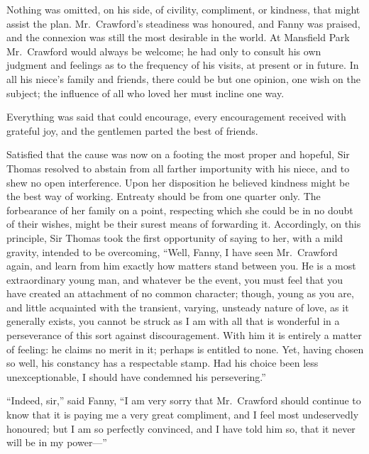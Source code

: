 Nothing was omitted, on his side, of civility, compliment,
or kindness, that might assist the plan.  Mr.\ Crawford's
steadiness was honoured, and Fanny was praised, and the
connexion was still the most desirable in the world.
At Mansfield Park Mr.\ Crawford would always be welcome;
he had only to consult his own judgment and feelings as
to the frequency of his visits, at present or in future.
In all his niece's family and friends, there could be
but one opinion, one wish on the subject; the influence
of all who loved her must incline one way.

Everything was said that could encourage, every encouragement
received with grateful joy, and the gentlemen parted
the best of friends.

Satisfied that the cause was now on a footing the most
proper and hopeful, Sir Thomas resolved to abstain
from all farther importunity with his niece, and to
shew no open interference.  Upon her disposition he
believed kindness might be the best way of working.
Entreaty should be from one quarter only.  The forbearance
of her family on a point, respecting which she could
be in no doubt of their wishes, might be their surest
means of forwarding it.  Accordingly, on this principle,
Sir Thomas took the first opportunity of saying to her,
with a mild gravity, intended to be overcoming,
``Well, Fanny, I have seen Mr.\ Crawford again, and learn
from him exactly how matters stand between you.  He is
a most extraordinary young man, and whatever be the event,
you must feel that you have created an attachment of no
common character; though, young as you are, and little
acquainted with the transient, varying, unsteady nature
of love, as it generally exists, you cannot be struck
as I am with all that is wonderful in a perseverance
of this sort against discouragement.  With him it is
entirely a matter of feeling:  he claims no merit in it;
perhaps is entitled to none.  Yet, having chosen so well,
his constancy has a respectable stamp.  Had his choice
been less unexceptionable, I should have condemned
his persevering.''

``Indeed, sir,'' said Fanny, ``I am very sorry that Mr.\ Crawford
should continue to know that it is paying me a very
great compliment, and I feel most undeservedly honoured;
but I am so perfectly convinced, and I have told him so,
that it never will be in my power---''

